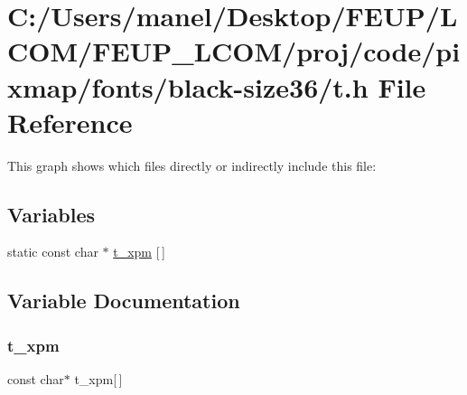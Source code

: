 \hypertarget{black-size36_2t_8h}{}\section{C\+:/\+Users/manel/\+Desktop/\+F\+E\+U\+P/\+L\+C\+O\+M/\+F\+E\+U\+P\+\_\+\+L\+C\+O\+M/proj/code/pixmap/fonts/black-\/size36/t.h File Reference}
\label{black-size36_2t_8h}
This graph shows which files directly or indirectly include this file\+:
\subsection*{Variables}
\begin{DoxyCompactItemize}
\item 
static const char $\ast$ \mbox{\hyperlink{black-size36_2t_8h_a7e17ba6d19d8ceb5a78a179da50af0d6}{t\+\_\+xpm}} \mbox{[}$\,$\mbox{]}
\end{DoxyCompactItemize}


\subsection{Variable Documentation}
\mbox{\label{black-size36_2t_8h_a7e17ba6d19d8ceb5a78a179da50af0d6}} 
\subsubsection{\texorpdfstring{t\_xpm}{t\_xpm}}
{\footnotesize\ttfamily const char$\ast$ t\+\_\+xpm\mbox{[}$\,$\mbox{]}\hspace{0.3cm}{\ttfamily [static]}}

